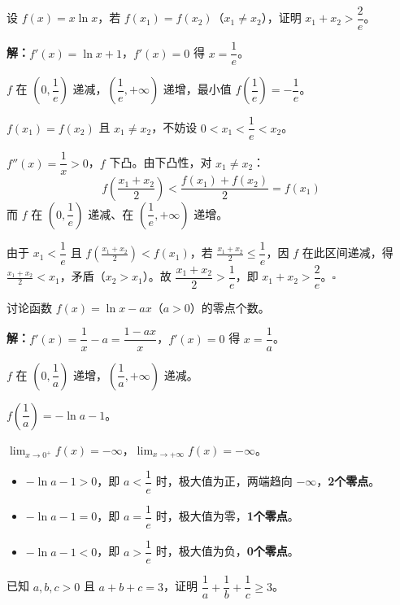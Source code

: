 \documentclass[12pt, a4paper]{ctexart}
\begin{document}
\begin{examplebox}[【例题7】零点与不等式的综合]
设 $f(x)=x\ln x$，若 $f(x_1)=f(x_2)$（$x_1\neq x_2$），证明 $x_1+x_2>\dfrac{2}{e}$。
\end{examplebox}

\textbf{解：}\quad $f'(x)=\ln x+1$，$f'(x)=0$ 得 $x=\dfrac{1}{e}$。\par
$f$ 在 $\left(0,\dfrac{1}{e}\right)$ 递减，$\left(\dfrac{1}{e},+\infty\right)$ 递增，最小值 $f\!\left(\dfrac{1}{e}\right)=-\dfrac{1}{e}$。\par
$f(x_1)=f(x_2)$ 且 $x_1\neq x_2$，不妨设 $0<x_1<\dfrac{1}{e}<x_2$。\par
$f''(x)=\dfrac{1}{x}>0$，$f$ 下凸。由下凸性，对 $x_1\neq x_2$：
\[
f\!\left(\frac{x_1+x_2}{2}\right)<\frac{f(x_1)+f(x_2)}{2}=f(x_1)
\]
而 $f$ 在 $\left(0,\dfrac{1}{e}\right)$ 递减、在 $\left(\dfrac{1}{e},+\infty\right)$ 递增。\par
由于 $x_1<\dfrac{1}{e}$ 且 $f\!\left(\frac{x_1+x_2}{2}\right)<f(x_1)$，若 $\frac{x_1+x_2}{2}\leq\dfrac{1}{e}$，因 $f$ 在此区间递减，得 $\frac{x_1+x_2}{2}<x_1$，矛盾（$x_2>x_1$）。故 $\dfrac{x_1+x_2}{2}>\dfrac{1}{e}$，即 $x_1+x_2>\dfrac{2}{e}$。\hfill$\square$

\begin{examplebox}[【例题8】含参函数的零点讨论]
讨论函数 $f(x)=\ln x-ax$（$a>0$）的零点个数。
\end{examplebox}

\textbf{解：}\quad $f'(x)=\dfrac{1}{x}-a=\dfrac{1-ax}{x}$，$f'(x)=0$ 得 $x=\dfrac{1}{a}$。\par
$f$ 在 $\left(0,\dfrac{1}{a}\right)$ 递增，$\left(\dfrac{1}{a},+\infty\right)$ 递减。\par
$f\!\left(\dfrac{1}{a}\right)=-\ln a-1$。\par
$\lim_{x\to 0^+}f(x)=-\infty$，$\lim_{x\to+\infty}f(x)=-\infty$。\par
\begin{itemize}[leftmargin=1.5em]
  \item $-\ln a-1>0$，即 $a<\dfrac{1}{e}$ 时，极大值为正，两端趋向 $-\infty$，\textbf{2个零点}。
  \item $-\ln a-1=0$，即 $a=\dfrac{1}{e}$ 时，极大值为零，\textbf{1个零点}。
  \item $-\ln a-1<0$，即 $a>\dfrac{1}{e}$ 时，极大值为负，\textbf{0个零点}。
\end{itemize}

\begin{examplebox}[【例题9】琴生不等式在高考压轴中的应用]
已知 $a,b,c>0$ 且 $a+b+c=3$，证明 $\dfrac{1}{a}+\dfrac{1}{b}+\dfrac{1}{c}\geq 3$。
\end{examplebox}
\end{document}

